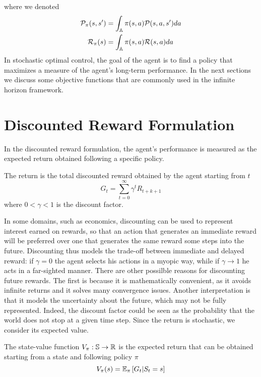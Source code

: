 where we denoted 
\begin{equation}
	\begin{split}
		\calP_\pi(s, s') &= \int_\A \pi(s, a) \calP(s, a, s') da\\
		\calR_\pi(s) &= \int_\A \pi(s, a) \calR(s, a) da\\
	\end{split}
\end{equation}
In stochastic optimal control, the goal of the agent is to find a policy that
maximizes a measure of the agent's long-term performance. In the next sections
we discuss some objective functions that are commonly used in the infinite
horizon framework. 

\section{Discounted Reward Formulation}
In the discounted reward formulation, the agent's performance is measured as
the expected return obtained following a specific policy.
\begin{definition}[Return]
	The return is the total discounted reward obtained by the agent starting 
	from $t$  
	\begin{equation}
		G_t = \sum^{\infty}_{t=0} \gamma^t R_{t+k+1} 
	\end{equation}
	where $0 < \gamma < 1$ is the discount factor.
\end{definition}
In some domains, such as economics, discounting can be used to represent
interest earned on rewards, so that an action that generates an immediate
reward will be preferred over one that generates the same reward some steps
into the future. Discounting thus models the trade-off between immediate and
delayed reward: if $\gamma = 0$ the agent selects his actions in a myopic way,
while if $\gamma \to 1$ he acts in a far-sighted manner. There are other
possilble reasons for discounting future rewards. The first is because it is
mathematically convenient, as it avoids infinite returns and it solves many
convergence issues. Another interpretation is that it models the uncertainty
about the future, which may not be fully represented. Indeed, the discount
factor could be seen as the probability that the world does not stop at a given 
time step. Since the return is stochastic, we consider its expected value.  
\begin{definition}
	The state-value function $V_\pi: \S \to \R$ is the expected return that can
	be obtained starting from a state and following policy $\pi$
	\begin{equation}
		V_\pi(s) = \E[\pi]{G_t|S_t = s}
	\end{equation}
\end{definition}
